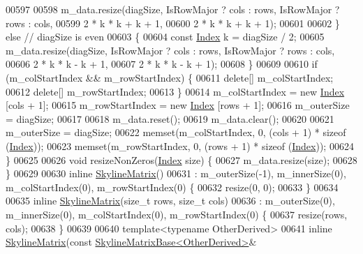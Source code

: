 \begin{DoxyCode}
00597 
00598             m\_data.resize(diagSize, IsRowMajor ? cols : rows, IsRowMajor ? rows : cols,
00599                     2 * k * k + k + 1,
00600                     2 * k * k + k + 1);
00601 
00602         \} \textcolor{keywordflow}{else} \textcolor{comment}{// diagSize is even}
00603         \{
00604             \textcolor{keyword}{const} \hyperlink{group___core___module_a554f30542cc2316add4b1ea0a492ff02}{Index} k = diagSize / 2;
00605             m\_data.resize(diagSize, IsRowMajor ? cols : rows, IsRowMajor ? rows : cols,
00606                     2 * k * k - k + 1,
00607                     2 * k * k - k + 1);
00608         \}
00609 
00610         \textcolor{keywordflow}{if} (m\_colStartIndex && m\_rowStartIndex) \{
00611             \textcolor{keyword}{delete}[] m\_colStartIndex;
00612             \textcolor{keyword}{delete}[] m\_rowStartIndex;
00613         \}
00614         m\_colStartIndex = \textcolor{keyword}{new} \hyperlink{group___core___module_a554f30542cc2316add4b1ea0a492ff02}{Index} [cols + 1];
00615         m\_rowStartIndex = \textcolor{keyword}{new} \hyperlink{group___core___module_a554f30542cc2316add4b1ea0a492ff02}{Index} [rows + 1];
00616         m\_outerSize = diagSize;
00617 
00618         m\_data.reset();
00619         m\_data.clear();
00620 
00621         m\_outerSize = diagSize;
00622         memset(m\_colStartIndex, 0, (cols + 1) * \textcolor{keyword}{sizeof} (\hyperlink{group___core___module_a554f30542cc2316add4b1ea0a492ff02}{Index}));
00623         memset(m\_rowStartIndex, 0, (rows + 1) * \textcolor{keyword}{sizeof} (\hyperlink{group___core___module_a554f30542cc2316add4b1ea0a492ff02}{Index}));
00624     \}
00625 
00626     \textcolor{keywordtype}{void} resizeNonZeros(\hyperlink{group___core___module_a554f30542cc2316add4b1ea0a492ff02}{Index} size) \{
00627         m\_data.resize(size);
00628     \}
00629 
00630     \textcolor{keyword}{inline} \hyperlink{class_eigen_1_1_skyline_matrix}{SkylineMatrix}()
00631     : m\_outerSize(-1), m\_innerSize(0), m\_colStartIndex(0), m\_rowStartIndex(0) \{
00632         resize(0, 0);
00633     \}
00634 
00635     \textcolor{keyword}{inline} \hyperlink{class_eigen_1_1_skyline_matrix}{SkylineMatrix}(\textcolor{keywordtype}{size\_t} rows, \textcolor{keywordtype}{size\_t} cols)
00636     : m\_outerSize(0), m\_innerSize(0), m\_colStartIndex(0), m\_rowStartIndex(0) \{
00637         resize(rows, cols);
00638     \}
00639 
00640     \textcolor{keyword}{template}<\textcolor{keyword}{typename} OtherDerived>
00641     \textcolor{keyword}{inline} \hyperlink{class_eigen_1_1_skyline_matrix}{SkylineMatrix}(\textcolor{keyword}{const} \hyperlink{class_eigen_1_1_skyline_matrix_base}{SkylineMatrixBase<OtherDerived>}&

\end{DoxyCode}
